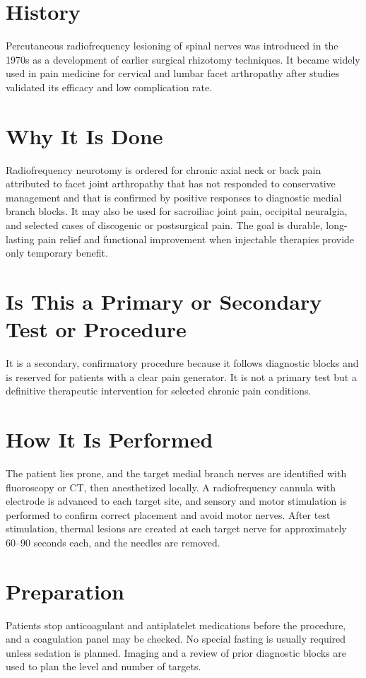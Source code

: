 \section*{History}
Percutaneous radiofrequency lesioning of spinal nerves was introduced in the 1970s as a development of earlier surgical rhizotomy techniques. It became widely used in pain medicine for cervical and lumbar facet arthropathy after studies validated its efficacy and low complication rate.

\section*{Why It Is Done}
Radiofrequency neurotomy is ordered for chronic axial neck or back pain attributed to facet joint arthropathy that has not responded to conservative management and that is confirmed by positive responses to diagnostic medial branch blocks. It may also be used for sacroiliac joint pain, occipital neuralgia, and selected cases of discogenic or postsurgical pain. The goal is durable, long-lasting pain relief and functional improvement when injectable therapies provide only temporary benefit.

\section*{Is This a Primary or Secondary Test or Procedure}
It is a secondary, confirmatory procedure because it follows diagnostic blocks and is reserved for patients with a clear pain generator. It is not a primary test but a definitive therapeutic intervention for selected chronic pain conditions.

\section*{How It Is Performed}
The patient lies prone, and the target medial branch nerves are identified with fluoroscopy or CT, then anesthetized locally. A radiofrequency cannula with electrode is advanced to each target site, and sensory and motor stimulation is performed to confirm correct placement and avoid motor nerves. After test stimulation, thermal lesions are created at each target nerve for approximately 60--90 seconds each, and the needles are removed.

\section*{Preparation}
Patients stop anticoagulant and antiplatelet medications before the procedure, and a coagulation panel may be checked. No special fasting is usually required unless sedation is planned. Imaging and a review of prior diagnostic blocks are used to plan the level and number of targets.

